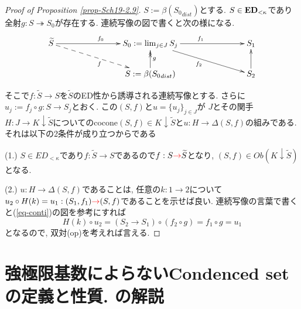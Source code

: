 \documentclass[dvipdfmx,a4paper,11pt]{report}
\theoremstyle{definition}
\newcommand{\xr}[1]{\textcolor{red}{#1}}
\begin{document}
\begin{proof}[Proof of Proposition \ref{prop-Sch19-2.9}]
$S := \beta ({S_0}_{dist})$とする. %
$S \in {\bf ED}_{< \kappa}$であり全射$g : S \twoheadrightarrow  S_0$が存在する. 
連続写像の図で書くと次の様になる. %
\begin{equation}
\label{eq-conti}
\xymatrix@C=78pt@R=20pt{
\widetilde{S} \ar@{->}[r]^{f_0}\ar@{-->}[rd]_{f} 
&S_0:= \lim_{j \in J}S_j \ar@{->}[rd]_{f_2}  \ar@{->}[r]^{f_1} 
& S_1 
\\
&S := \beta ({S_0}_{dist}) \ar@{->>}[u]_{g} 
&
S_2\ar@{->}[u] 
}
\end{equation}


そこで$f : \widetilde{S} \to S $を$\widetilde{S}$のED性から誘導される連続写像とする. 
さらに$u_j := f_j \circ g: S \to S_j$とおく. この$(S, f)$と$u=\{ u_j \}_{j \in J}$が
$J$とその関手$H : J \to K \downarrow \widetilde{S}$についてのcocone$(S,f) \in K \downarrow \widetilde{S}$と$u : H \to \Delta (S,f)$の組みである. 
それは以下の2条件が成り立つからである

(1.) $S \in ED_{<\kappa}$であり$f : \widetilde{S} \to S $であるので$f : S \xr{\to} \widetilde{S}$となり, $(S, f) \in Ob(K \downarrow \widetilde{S})$となる. 

(2.) $u : H \to \Delta (S,f)$であることは, 任意の$k : 1 \to 2$について
$u_{2} \circ H(k)  = u_{1} : (S_1,f_1) \xr{\to} (S,f)$であることを示せば良い.
連続写像の言葉で書くと(\ref{eq-conti})の図を参考にすれば
$$
H(k) \circ u_2
=
(S_2 \to S_1) \circ (f_2 \circ g)
=
f_1 \circ g 
=
u_1
$$
となるので, 双対(op)を考えれば言える.
\end{proof}

\section{強極限基数によらないCondenced setの定義と性質. \cite[Definition 2.11]{Sch19}の解説}
\end{document}
